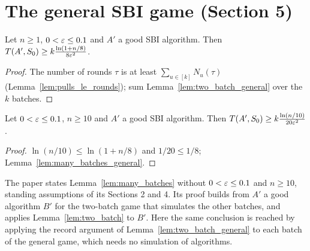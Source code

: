 \chapter{The general SBI game (Section 5)}
\label{chap:many_batches}

\begin{lemma}
  \label{lem:many_batches_general}
  \leanok
  Let $n \ge 1$, $0 < \varepsilon \le 0.1$ and $A'$ a good SBI algorithm. Then
  $T(A', S_0) \ge k \frac{\ln(1 + n/8)}{8\varepsilon^2}$.
\end{lemma}

\begin{proof}
  \leanok
  The number of rounds $\tau$ is at least $\sum_{u \in [k]} N_u(\tau)$
  (Lemma~\ref{lem:pulls_le_rounds}); sum Lemma~\ref{lem:two_batch_general} over the $k$ batches.
\end{proof}

\begin{lemma}
  \label{lem:many_batches}
  \leanok
  Let $0 < \varepsilon \le 0.1$, $n \ge 10$ and $A'$ a good SBI algorithm. Then
  $T(A', S_0) \ge k \frac{\ln(n/10)}{20\varepsilon^2}$.
\end{lemma}

\begin{proof}
  \leanok
  $\ln(n/10) \le \ln(1 + n/8)$ and $1/20 \le 1/8$; Lemma~\ref{lem:many_batches_general}.
\end{proof}

\begin{remark}
  The paper states Lemma~\ref{lem:many_batches} without $0 < \varepsilon \le 0.1$ and $n \ge 10$, standing
  assumptions of its Sections 2 and 4. Its proof builds from $A'$ a good algorithm $B'$ for the
  two-batch game that simulates the other batches, and applies Lemma~\ref{lem:two_batch} to $B'$.
  Here the same conclusion is reached by applying the record argument of
  Lemma~\ref{lem:two_batch_general} to each batch of the general game, which needs no
  simulation of algorithms.
\end{remark}
